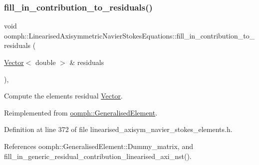 \subsubsection{\texorpdfstring{fill\+\_\+in\+\_\+contribution\+\_\+to\+\_\+residuals()}{fill\_in\_contribution\_to\_residuals()}}
{\footnotesize\ttfamily void oomph\+::\+Linearised\+Axisymmetric\+Navier\+Stokes\+Equations\+::fill\+\_\+in\+\_\+contribution\+\_\+to\+\_\+residuals (\begin{DoxyParamCaption}\item[{\hyperlink{classoomph_1_1Vector}{Vector}$<$ double $>$ \&}]{residuals }\end{DoxyParamCaption})\hspace{0.3cm}{\ttfamily [inline]}, {\ttfamily [virtual]}}



Compute the element\textquotesingle{}s residual \hyperlink{classoomph_1_1Vector}{Vector}. 



Reimplemented from \hyperlink{classoomph_1_1GeneralisedElement_a310c97f515e8504a48179c0e72c550d7}{oomph\+::\+Generalised\+Element}.



Definition at line 372 of file linearised\+\_\+axisym\+\_\+navier\+\_\+stokes\+\_\+elements.\+h.



References oomph\+::\+Generalised\+Element\+::\+Dummy\+\_\+matrix, and fill\+\_\+in\+\_\+generic\+\_\+residual\+\_\+contribution\+\_\+linearised\+\_\+axi\+\_\+nst().

\mbox{\label{classoomph_1_1LinearisedAxisymmetricNavierStokesEquations_aeb4a4fb1574ee29efdf2bff220e65106}} 

